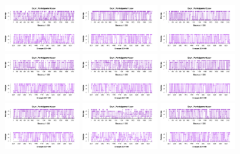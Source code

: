 \documentclass[a4paper ]{article}
\begin{document}
\begin{figure}[th]
\includegraphics[width=0.3\textwidth]{Figures/Rating_Exp1_P10} \includegraphics[width=0.3\textwidth]{Figures/Rating_Exp1_P11} \includegraphics[width=0.3\textwidth]{Figures/Rating_Exp1_P12}
\includegraphics[width=0.3\textwidth]{Figures/Rating_Exp1_P13} \includegraphics[width=0.3\textwidth]{Figures/Rating_Exp1_P14} \includegraphics[width=0.3\textwidth]{Figures/Rating_Exp1_P15}
\includegraphics[width=0.3\textwidth]{Figures/Rating_Exp1_P16} \includegraphics[width=0.3\textwidth]{Figures/Rating_Exp1_P17} \includegraphics[width=0.3\textwidth]{Figures/Rating_Exp1_P18}

\end{figure}
\end{document}

